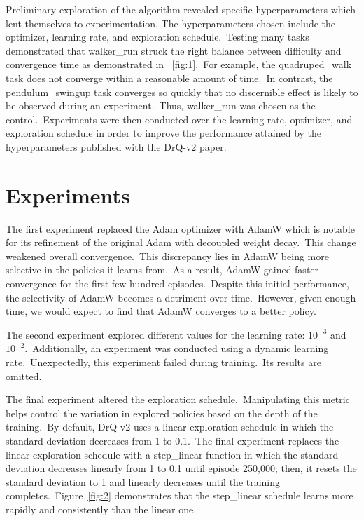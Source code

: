 \documentclass[conference]{./IEEEtran/IEEEtran} %
\begin{document}
    Preliminary exploration of the algorithm revealed specific hyperparameters which lent themselves to experimentation.
    The hyperparameters chosen include the optimizer, learning rate, and exploration schedule.\ Testing many tasks
    demonstrated that walker\_run struck the right balance between difficulty and convergence time as demonstrated in
    ~\ref{fig:1}.\ For example, the quadruped\_walk task does not converge within a reasonable amount of time.\ In
    contrast, the pendulum\_swingup task converges so quickly that no discernible effect is likely to be observed during
    an experiment.\ Thus, walker\_run was chosen as the control.\ Experiments were then conducted over the learning
    rate, optimizer, and exploration schedule in order to improve the performance attained by the hyperparameters
    published with the DrQ-v2 paper.

    \section{Experiments}\label{sec:experiments}
    The first experiment replaced the Adam optimizer with AdamW which is notable for its refinement of the original Adam
    with decoupled weight decay.\ This change weakened overall convergence.\ This discrepancy lies in AdamW being more
    selective in the policies it learns from.\ As a result, AdamW gained faster convergence for the first few hundred
    episodes.\ Despite this initial performance, the selectivity of AdamW becomes a detriment over time.\ However, given
    enough time, we would expect to find that AdamW converges to a better policy.

    The second experiment explored different values for the learning rate: $10^{-3}$ and $10^{-2}$.\ Additionally, an
    experiment was conducted using a dynamic learning rate.\ Unexpectedly, this experiment failed during training.\ Its
    results are omitted.
    
    The final experiment altered the exploration schedule.\ Manipulating this metric helps control the variation in
    explored policies based on the depth of the training.\ By default, DrQ-v2 uses a linear exploration schedule in
    which the standard deviation decreases from 1 to 0.1.\ The final experiment replaces the linear exploration schedule
    with a step\_linear function in which the standard deviation decreases linearly from 1 to 0.1 until episode 250,000;
    then, it resets the standard deviation to 1 and linearly decreases until the training completes.\ Figure~\ref{fig:2}
    demonstrates that the step\_linear schedule learns more rapidly and consistently than the linear one.
    
\end{document}
